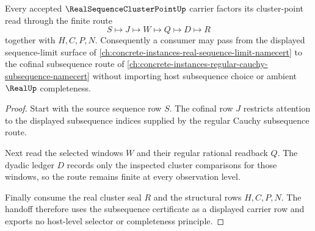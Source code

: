 \begin{theorem}\label{thm:real-sequence-cluster-point-subsequence-handoff}
Every accepted $\RealSequenceClusterPointUp$ carrier factors its cluster-point read through the finite route
$$
S\longmapsto J\longmapsto W\longmapsto Q\longmapsto D\longmapsto R
$$
together with $H,C,P,N$. Consequently a consumer may pass from the displayed sequence-limit surface of \autoref{ch:concrete-instances-real-sequence-limit-namecert} to the cofinal subsequence route of \autoref{ch:concrete-instances-regular-cauchy-subsequence-namecert} without importing host subsequence choice or ambient $\RealUp$ completeness.
\end{theorem}
\begin{proof}
Start with the source sequence row $S$. The cofinal row $J$ restricts attention to the displayed subsequence indices supplied by the regular Cauchy subsequence route.

Next read the selected windows $W$ and their regular rational readback $Q$. The dyadic ledger $D$ records only the inspected cluster comparisons for those windows, so the route remains finite at every observation level.

Finally consume the real cluster seal $R$ and the structural rows $H,C,P,N$. The handoff therefore uses the subsequence certificate as a displayed carrier row and exports no host-level selector or completeness principle.
\end{proof}

